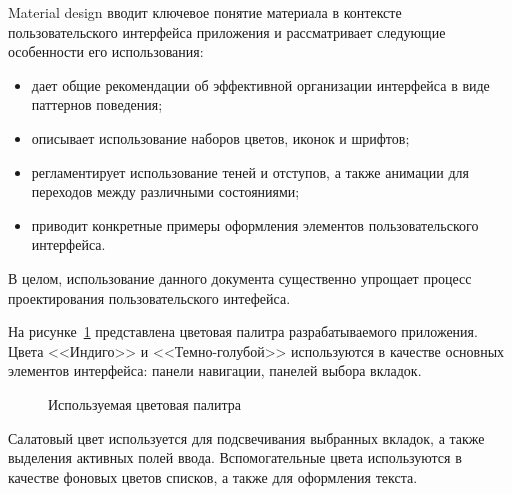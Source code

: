 Material design вводит ключевое понятие материала в контексте
пользовательского интерфейса приложения и рассматривает следующие
особенности его использования:
\begin{itemize}
\item дает общие рекомендации об эффективной организации интерфейса
  в виде паттернов поведения;
\item описывает использование наборов цветов, иконок и шрифтов;
\item регламентирует использование теней и отступов,
  а также анимации для переходов между различными состояниями;
\item приводит конкретные примеры оформления элементов
  пользовательского интерфейса.
\end{itemize}
В целом, использование данного документа существенно упрощает процесс
проектирования пользовательского интефейса.

На рисунке~\ref{fig:design_colors} представлена цветовая палитра
разрабатываемого приложения. Цвета <<Индиго>> и <<Темно-голубой>>
используются в качестве основных элементов интерфейса:
панели навигации, панелей выбора вкладок.

\begin{figure}[h!]
  \centering
  \caption{Используемая цветовая палитра}
  \label{fig:design_colors}
\end{figure}

Салатовый цвет используется для подсвечивания выбранных вкладок,
а также выделения активных полей ввода.
Вспомогательные цвета используются в качестве фоновых цветов списков,
а также для оформления текста.

